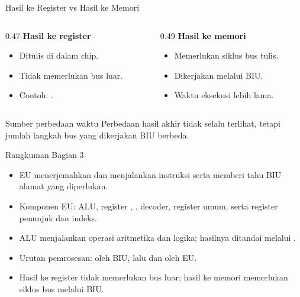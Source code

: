 \documentclass[aspectratio=169,11pt]{beamer}
\begin{document}
\begin{frame}{Hasil ke Register vs Hasil ke Memori}
\small
\begin{columns}[t]
\begin{column}{0.47\textwidth}
    {\color{obeTeal}\bfseries Hasil ke register}\\[0.25em]
    \begin{itemize}
        \item Ditulis di dalam chip.
        \item Tidak memerlukan bus luar.
        \item Contoh: .
    \end{itemize}
\end{column}
\begin{column}{0.49\textwidth}
    {\color{obeMaroon}\bfseries Hasil ke memori}\\[0.25em]
    \begin{itemize}
        \item Memerlukan siklus bus tulis.
        \item Dikerjakan melalui BIU.
        \item Waktu eksekusi lebih lama.
    \end{itemize}
\end{column}
\end{columns}

\vspace{0.5em}
\begin{block}{Sumber perbedaan waktu}
\small Perbedaan hasil akhir tidak selalu terlihat, tetapi jumlah
langkah bus yang dikerjakan BIU berbeda.
\end{block}
\end{frame}

\begin{frame}{Rangkuman Bagian 3}
\small
\begin{itemize}
    \item EU menerjemahkan dan menjalankan instruksi serta memberi
          tahu BIU alamat  yang diperlukan.

    \vspace{0.15em}
    \item Komponen EU: ALU, register , ,
          decoder, register umum, serta register penunjuk dan indeks.

    \vspace{0.15em}
    \item ALU menjalankan operasi aritmetika dan logika; hasilnya
          ditandai melalui .

    \vspace{0.15em}
    \item Urutan pemrosesan:  oleh BIU, lalu
           dan  oleh EU.

    \vspace{0.15em}
    \item Hasil ke register tidak memerlukan bus luar; hasil ke
          memori memerlukan siklus bus melalui BIU.
\end{itemize}
\end{frame}
\end{document}
